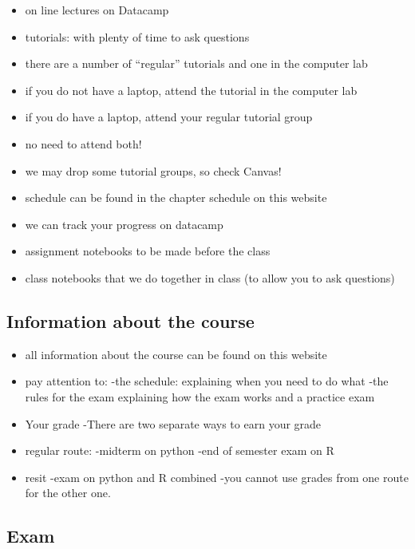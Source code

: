 \documentclass[]{book}
\providecommand{\tightlist}{%
  \setlength{\itemsep}{0pt}\setlength{\parskip}{0pt}}
\begin{document}
\begin{itemize}
\tightlist
\item
  on line lectures on Datacamp
\item
  tutorials: with plenty of time to ask questions
\item
  there are a number of ``regular'' tutorials and one in the computer
  lab
\item
  if you do not have a laptop, attend the tutorial in the computer lab
\item
  if you do have a laptop, attend your regular tutorial group
\item
  no need to attend both!
\item
  we may drop some tutorial groups, so check Canvas!
\item
  schedule can be found in the chapter schedule on this website
\item
  we can track your progress on datacamp
\item
  assignment notebooks to be made before the class
\item
  class notebooks that we do together in class (to allow you to ask
  questions)
\end{itemize}

\subsection{Information about the
course}\label{information-about-the-course}

\begin{itemize}
\item
  all information about the course can be found on this website
\item
  pay attention to: -the schedule: explaining when you need to do what
  -the rules for the exam explaining how the exam works and a practice
  exam
\item
  Your grade -There are two separate ways to earn your grade
\item
  regular route: -midterm on python -end of semester exam on R
\item
  resit -exam on python and R combined -you cannot use grades from one
  route for the other one.
\end{itemize}

\subsection{Exam}\label{exam}
\end{document}
